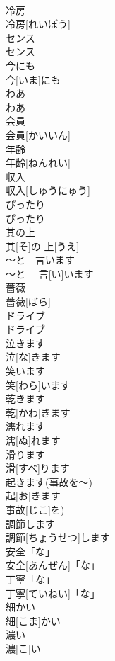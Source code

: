 \documentclass[8pt]{extreport}
\begin{document}
\begin{CJK}{UTF8}{min}
\\	冷房	
\\	冷房[れいぼう]	
\\	センス	
\\	センス	
\\	今にも	
\\	今[いま]にも	
\\	わあ	
\\	わあ	
\\	会員	
\\	会員[かいいん]	
\\	年齢	
\\	年齢[ねんれい]	
\\	収入	
\\	収入[しゅうにゅう]	
\\	ぴったり	
\\	ぴったり	
\\	其の上	
\\	其[そ]の 上[うえ]	
\\	〜と　言います	
\\	〜と　 言[い]います	
\\	薔薇	
\\	薔薇[ばら]	
\\	ドライブ	
\\	ドライブ	
\\	泣きます	
\\	泣[な]きます	
\\	笑います	
\\	笑[わら]います	
\\	乾きます	
\\	乾[かわ]きます	
\\	濡れます	
\\	濡[ぬ]れます	
\\	滑ります	
\\	滑[すべ]ります	
\\	起きます(事故を～)	
\\	起[お]きます
\\	事故[じこ]を)	
\\	調節します	
\\	調節[ちょうせつ]します	
\\	安全「な」	
\\	安全[あんぜん]「な」	
\\	丁寧「な」	
\\	丁寧[ていねい]「な」	
\\	細かい	
\\	細[こま]かい	
\\	濃い	
\\	濃[こ]い	

\end{CJK}
\end{document}
